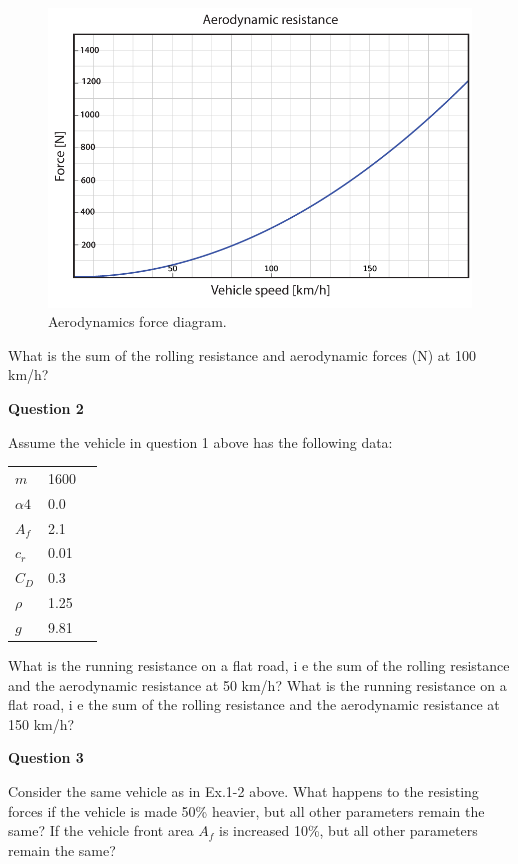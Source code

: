 \begin{figure}[!htb]
\begin{center}
\includegraphics[scale=0.280]{img/physics/Diagram_AerodynamicResistance_01.png}
\end{center}
\caption{Aerodynamics force diagram.}
\label{Diagram_AerodynamicResistance_01}
\end{figure}

What is the sum of the rolling resistance and aerodynamic forces (N) at 100 km/h?


\textbf{Question 2}

Assume the vehicle in question 1 above has the following data:

\begin{tabular}{lll}
\hline
$m$ & 1600\\
$\alpha4$ & 0.0 \\
$A_f$ & 2.1\\
$c_r$ & 0.01\\
$C_D$ & 0.3 \\
$\rho$ & 1.25 \\
$g$ & 9.81 \\
\hline
\end{tabular}

What is the running resistance on a flat road, i e the sum of the rolling resistance and the aerodynamic resistance at 50 km/h? What is the running resistance on a flat road, i e the sum of the rolling resistance and the aerodynamic resistance at 150 km/h?

\textbf{Question 3}

Consider the same vehicle as in Ex.1-2 above. What happens to the resisting forces if the vehicle is made 50\% heavier, but all other parameters remain the same? If the  vehicle front area $A_f$ is increased 10\%, but all other parameters remain the same?







